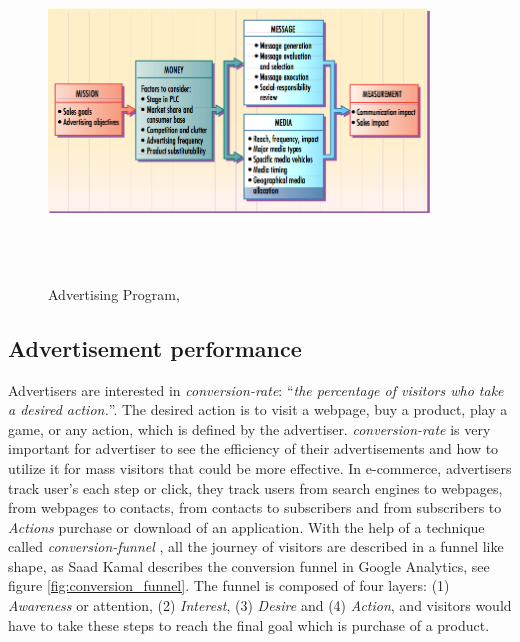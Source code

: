 \begin{figure}[H]
\centering
\includegraphics[width=0.9\textwidth,height=90mm]{Figures/2/adprogram}
\caption{Advertising Program, \cite{adprogram}}
\label{fig:adprograme}
\end{figure}




\subsection{Advertisement performance}
\label{adperformancebackground}
Advertisers are interested in \emph{conversion-rate}: ``\emph{the percentage of visitors who take a desired action.}''\cite{convrate}. The desired action is to visit a webpage, buy a product, play a game, or any action, which is defined by the advertiser. \emph{conversion-rate} is very important for advertiser to see the efficiency of their advertisements and how to utilize it for mass visitors that could be more effective. In e-commerce, advertisers track user’s each step or click, they track users from search engines to webpages, from webpages to contacts, from contacts to subscribers and from subscribers to \emph{Actions} purchase or download of an application. With the help of a technique called \emph{conversion-funnel} \cite{convfunnel}, all the journey of visitors are described in a funnel like shape, as Saad Kamal \cite{googlefunnel} describes the conversion funnel in Google Analytics, see figure \ref{fig:conversion_funnel}. The funnel is composed of four layers: (1) \emph{Awareness} or attention, (2) \emph{Interest}, (3) \emph{Desire} and (4) \emph{Action}, and visitors would have to take these steps to reach the final goal which is purchase of a product. 

